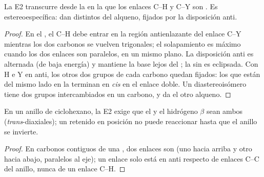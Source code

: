 \begin{proposition}\label{prop:b1:elimination:anti}
La E2 transcurre desde la  en la que los enlaces C--H y C--Y
son . Es estereoespecífica:  
dan  distintos del alqueno, fijados por la disposición
anti.
\end{proposition}

\begin{proof}
En el , el  C--H debe entrar en la
región antienlazante del enlace C--Y mientras los dos carbonos se vuelven
trigonales; el solapamiento es máximo cuando los dos enlaces son
paralelos, en un mismo plano. La disposición anti es alternada (de baja
energía) y mantiene la base lejos del ; la sin es
eclipsada. Con H e Y en anti, los otros dos grupos de cada carbono quedan
fijados: los que están del mismo lado en la  terminan
en \textit{cis} en el enlace doble. Un diastereoisómero tiene dos grupos
intercambiados en un carbono, y da el otro alqueno.
\end{proof}

\begin{proposition}[E2 en un ciclohexano]\label{prop:b1:elimination:cyclohexane-e2}
En un anillo de ciclohexano, la E2 exige que el  y el
hidrógeno $\beta$ sean ambos  (\textit{trans}-diaxiales); un  retenido en posición  no puede reaccionar hasta que el
anillo se invierte.
\end{proposition}

\begin{proof}
En carbonos contiguos de una , dos enlaces  son
 (uno hacia arriba y otro hacia abajo, paralelos al eje);
un enlace  solo está en anti respecto de enlaces C--C del
anillo, nunca de un enlace C--H.
\end{proof}


